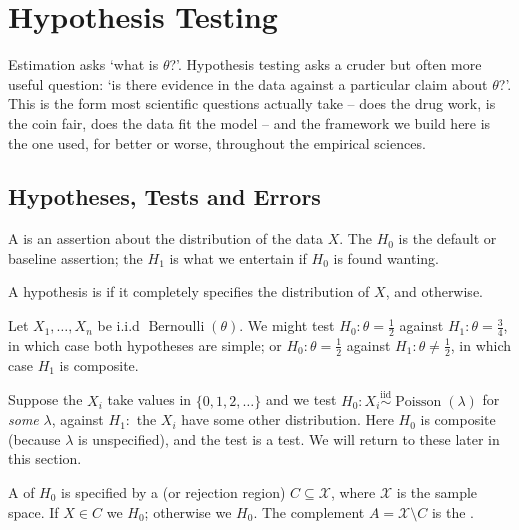 \documentclass[a4paper]{scrartcl}
\newcommand{\Poisson}{\operatorname{Poisson}}
\newcommand{\Bern}{\operatorname{Bernoulli}}
\begin{document}
\section{Hypothesis Testing}

Estimation asks `what is $\theta$?'. Hypothesis testing asks a cruder but often more useful question: `is there evidence in the data against a particular claim about $\theta$?'. This is the form most scientific questions actually take -- does the drug work, is the coin fair, does the data fit the model -- and the framework we build here is the one used, for better or worse, throughout the empirical sciences.

\subsection{Hypotheses, Tests and Errors}

\begin{definition}[Hypothesis]
  A  is an assertion about the distribution of the data $X$. The  $H_0$ is the default or baseline assertion; the  $H_1$ is what we entertain if $H_0$ is found wanting.

  A hypothesis is  if it completely specifies the distribution of $X$, and  otherwise.
\end{definition}

\begin{example}
  Let $X_1, \dots, X_n$ be i.i.d $\Bern(\theta)$. We might test $H_0 : \theta = \frac{1}{2}$ against $H_1 : \theta = \frac{3}{4}$, in which case both hypotheses are simple; or $H_0 : \theta = \frac{1}{2}$ against $H_1 : \theta \neq \frac{1}{2}$, in which case $H_1$ is composite.
\end{example}

\begin{example}
  Suppose the $X_i$ take values in $\{0, 1, 2, \dots\}$ and we test $H_0 : X_i \stackrel{\text{iid}}{\sim} \Poisson(\lambda)$ for \emph{some} $\lambda$, against $H_1 :$ the $X_i$ have some other distribution. Here $H_0$ is composite (because $\lambda$ is unspecified), and the test is a  test. We will return to these later in this section.
\end{example}

\begin{definition}[Test]
  A  of $H_0$ is specified by a  (or rejection region) $C \subseteq \mathcal{X}$, where $\mathcal{X}$ is the sample space. If $X \in C$ we  $H_0$; otherwise we  $H_0$. The complement $A = \mathcal{X}\setminus C$ is the .
\end{definition}
\end{document}
